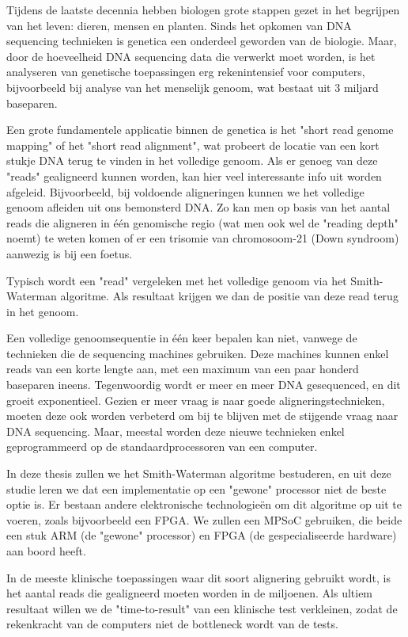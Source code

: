 Tijdens de laatste decennia hebben biologen grote stappen gezet in het begrijpen van het leven: dieren, mensen en planten. Sinds het opkomen van DNA sequencing technieken is genetica een onderdeel geworden van de biologie. Maar, door de hoeveelheid DNA sequencing data die verwerkt moet worden, is het analyseren van genetische toepassingen erg rekenintensief voor computers, bijvoorbeeld bij analyse van het menselijk genoom, wat bestaat uit 3 miljard baseparen.

Een grote fundamentele applicatie binnen de genetica is het "short read genome mapping" of het "short read alignment", wat probeert de locatie van een kort stukje DNA terug te vinden in het volledige genoom. Als er genoeg van deze "reads" gealigneerd kunnen worden, kan hier veel interessante info uit worden afgeleid. Bijvoorbeeld, bij voldoende aligneringen kunnen we het volledige genoom afleiden uit ons bemonsterd DNA. Zo kan men op basis van het aantal reads die aligneren in \'e\'en genomische regio (wat men ook wel de "reading depth" noemt) te weten komen of er een trisomie van chromosoom-21 (Down syndroom) aanwezig is bij een foetus.

Typisch wordt een "read" vergeleken met het volledige genoom via het Smith-Waterman algoritme. Als resultaat krijgen we dan de positie van deze read terug in het genoom.

Een volledige genoomsequentie in \'e\'en keer bepalen kan niet, vanwege de technieken die de sequencing machines gebruiken. Deze machines kunnen enkel reads van een korte lengte aan, met een maximum van een paar honderd baseparen ineens. Tegenwoordig wordt er meer en meer DNA gesequenced, en dit groeit exponentieel. Gezien er meer vraag is naar goede aligneringstechnieken, moeten deze ook worden verbeterd om bij te blijven met de stijgende vraag naar DNA sequencing. Maar, meestal worden deze nieuwe technieken enkel geprogrammeerd op de standaardprocessoren van een computer.

In deze thesis zullen we het Smith-Waterman algoritme bestuderen, en uit deze studie leren we dat een implementatie op een "gewone" processor niet de beste optie is. Er bestaan andere elektronische technologie\"en om dit algoritme op uit te voeren, zoals bijvoorbeeld een FPGA. We zullen een MPSoC gebruiken, die beide een stuk ARM (de "gewone" processor) en FPGA (de gespecialiseerde hardware) aan boord heeft.

In de meeste klinische toepassingen waar dit soort alignering gebruikt wordt, is het aantal reads die gealigneerd moeten worden in de miljoenen. Als ultiem resultaat willen we de "time-to-result" van een klinische test verkleinen, zodat de rekenkracht van de computers niet de bottleneck wordt van de tests.


